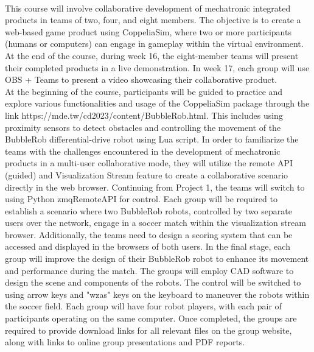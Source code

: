 \begin{center}
\LARGE\textbf{}\\
\begin{flushleft}
\fontsize{14pt}{16pt}\sectionef\hspace{12pt}\quad This course will involve collaborative development of mechatronic integrated products in teams of two, four, and eight members. The objective is to create a web-based game product using CoppeliaSim, where two or more participants (humans or computers) can engage in gameplay within the virtual environment. At the end of the course, during week 16, the eight-member teams will present their completed products in a live demonstration. In week 17, each group will use OBS + Teams to present a video showcasing their collaborative product.\\[12pt]

\fontsize{14pt}{16pt}\sectionef\hspace{12pt}\quad At the beginning of the course, participants will be guided to practice and explore various functionalities and usage of the CoppeliaSim package through the link https://mde.tw/cd2023/content/BubbleRob.html. This includes using proximity sensors to detect obstacles and controlling the movement of the BubbleRob differential-drive robot using Lua script. In order to familiarize the teams with the challenges encountered in the development of mechatronic products in a multi-user collaborative mode, they will utilize the remote API (guided) and Visualization Stream feature to create a collaborative scenario directly in the web browser. Continuing from Project 1, the teams will switch to using Python zmqRemoteAPI for control. Each group will be required to establish a scenario where two BubbleRob robots, controlled by two separate users over the network, engage in a soccer match within the visualization stream browser. Additionally, the teams need to design a scoring system that can be accessed and displayed in the browsers of both users. In the final stage, each group will improve the design of their BubbleRob robot to enhance its movement and performance during the match. The groups will employ CAD software to design the scene and components of the robots. The control will be switched to using arrow keys and "wzas" keys on the keyboard to maneuver the robots within the soccer field. Each group will have four robot players, with each pair of participants operating on the same computer. Once completed, the groups are required to provide download links for all relevant files on the group website, along with links to online group presentations and PDF reports.\\[12pt]


\end{flushleft}
\end{center}

